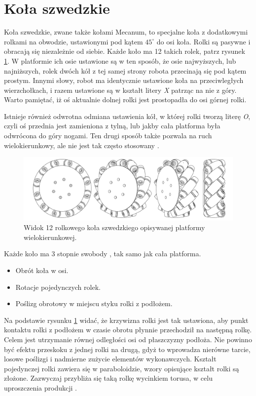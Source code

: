 \section{Koła szwedzkie}
	Koła szwedzkie, zwane także kołami Mecanum, to specjalne koła z dodatkowymi rolkami na obwodzie, ustawionymi pod kątem $45^\circ$ do osi koła.
	Rolki są pasywne i obracają się niezależnie od siebie. Każde koło ma 12 takich rolek, patrz rysunek \ref{fig:wheel}.
	W platformie ich osie ustawione są w ten sposób, że osie najwyższych, lub najniższych, rolek dwóch kół z tej samej strony robota przecinają się pod kątem prostym.
	Innymi słowy, robot ma identycznie ustawione koła na przeciwległych wierzchołkach, i razem ustawione są w kształt litery \emph{X} patrząc na nie z góry.
	Warto pamiętać, iż oś aktualnie dolnej rolki jest prostopadła do osi górnej rolki.

	Istnieje również odwrotna odmiana ustawienia kół, w której rolki tworzą literę \emph{O}, 
	czyli oś przednia jest zamieniona z tylną, lub jakby cała platforma była odwrócona do góry nogami.
	Ten drugi sposób także pozwala na ruch wielokierunkowy, ale nie jest tak często stosowany \cite{paletobot}.

	\begin{figure}[H]
	\centering
	\includegraphics[width=\textwidth]{graphics/wheel.pdf}
	\caption{Widok 12 rolkowego koła szwedzkiego opisywanej platformy wielokierunkowej.}
	\label{fig:wheel}
	\end{figure} 

	Każde koło ma 3 stopnie swobody \cite{kinematic_modeling}, tak samo jak cała platforma.
	\begin{itemize}
		\item Obrót koła w osi.
		\item Rotacje pojedynczych rolek.
		\item Poślizg obrotowy w miejscu styku rolki z podłożem.
	\end{itemize}

	Na podstawie rysunku \ref{fig:wheel} widać, że krzywizna rolki jest tak ustawiona, aby punkt kontaktu rolki z podłożem w czasie obrotu płynnie przechodził na następną rolkę.
	Celem jest utrzymanie równej odległości osi od płaszczyzny podłoża.
	Nie powinno być efektu przeskoku z jednej rolki na drugą, gdyż to wprowadza nierówne tarcie, losowe poślizgi i nadmierne zużycie elementów wykonawczych.
	Kształt pojedynczej rolki zawiera się w paraboloidzie, wzory opisujące kształt rolki są złożone.
	Zazwyczaj przybliża się taką rolkę wycinkiem torusa, w celu uproszczenia produkcji \cite{rollers}.

